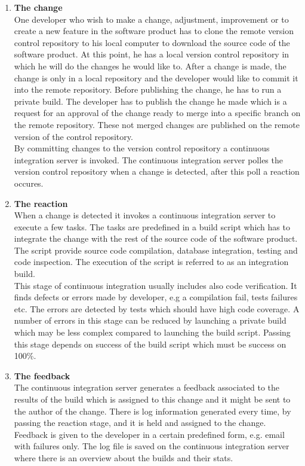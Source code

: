 \begin{enumerate}

	\item \textbf{The change}\\[0.1em]
		  One developer who wish to make a change, adjustment, improvement or to create a new feature in the software product has to clone the remote version control repository to his local computer to download the source code of the software product. At this point, he has a local version control repository in which he will do the changes he would like to. After a change is made, the change is only in a local repository and the developer would like to commit it into the remote repository. Before publishing the change, he has to run a private build. The developer has to publish the change he made which is a request for an approval of the change ready to merge into a specific branch on the remote repository. These not merged changes are published on the remote version of the control repository.\\[0.1em]
		  By committing changes to the version control repository a continuous integration server is invoked. The continuous integration server polles the version control repository when a change is detected, after this poll a reaction occures.

	\item \textbf{The reaction}\\[0.1em]
		  When a change is detected it invokes a continuous integration server to execute a few tasks. The tasks are predefined in a build script which has to integrate the change with the rest of the source code of the software product. The script provide source code compilation, database integration, testing and code inspection. The execution of the script is referred to as an integration build.\\[0.1em]
		  This stage of continuous integration usually includes also code verification. It finds defects or errors made by developer, e.g a compilation fail, tests failures etc. The errors are detected by tests which should have high code coverage. A number of errors in this stage can be reduced by launching a private build which may be less complex compared to launching the build script. Passing this stage depends on success of the build script which must be success on 100\%.

	\item \textbf{The feedback}\\[0.1em]
		  The continuous integration server generates a feedback associated to the results of the build which is assigned to this change and it might be sent to the author of the change. There is log information generated every time, by passing the reaction stage, and it is held and assigned to the change. Feedback is given to the developer in a certain predefined form, e.g. email with failures only. The log file is saved on the continuous integration server where there is an overview about the builds and their stats.


\end{enumerate}
